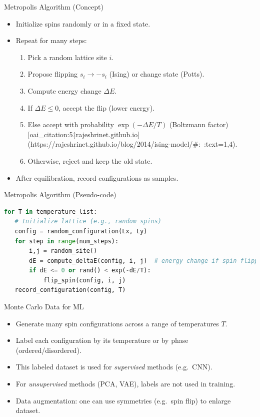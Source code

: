 \documentclass{beamer}
\begin{document}
\begin{frame}{Metropolis Algorithm (Concept)}
 \begin{itemize}
   \item Initialize spins randomly or in a fixed state.
   \item Repeat for many steps:
     \begin{enumerate}
       \item Pick a random lattice site $i$.
       \item Propose flipping $s_i \to -s_i$ (Ising) or change state (Potts).
       \item Compute energy change $\Delta E$.
       \item If $\Delta E \le 0$, accept the flip (lower energy).
       \item Else accept with probability $\exp(-\Delta E/T)$ (Boltzmann factor) [oai_citation:5‡rajeshrinet.github.io](https://rajeshrinet.github.io/blog/2014/ising-model/#:~:text=1,4).
       \item Otherwise, reject and keep the old state.
     \end{enumerate}
   \item After equilibration, record configurations as samples.
 \end{itemize}
\end{frame}

\begin{frame}[fragile]{Metropolis Algorithm (Pseudo-code)}
 \begin{lstlisting}[language=Python]
for T in temperature_list:
   # Initialize lattice (e.g., random spins)
   config = random_configuration(Lx, Ly)
   for step in range(num_steps):
       i,j = random_site()
       dE = compute_deltaE(config, i, j)  # energy change if spin flipped
       if dE <= 0 or rand() < exp(-dE/T):
           flip_spin(config, i, j)
   record_configuration(config, T)
 \end{lstlisting}
\end{frame}

\begin{frame}{Monte Carlo Data for ML}
 \begin{itemize}
   \item Generate many spin configurations across a range of temperatures $T$.
   \item Label each configuration by its temperature or by phase (ordered/disordered).
   \item This labeled dataset is used for \emph{supervised} methods (e.g.\ CNN).
   \item For \emph{unsupervised} methods (PCA, VAE), labels are not used in training.
   \item Data augmentation: one can use symmetries (e.g.\ spin flip) to enlarge dataset.
 \end{itemize}
\end{frame}
\end{document}
